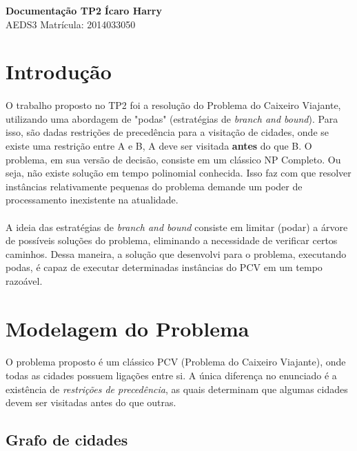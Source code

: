 \documentclass[a4paper, 12pt]{article}
\begin{document}
\noindent
\large\textbf{Documentação TP2} \hfill \textbf{Ícaro Harry} \\
\normalsize AEDS3 \hfill  Matrícula: 2014033050\\


\section{Introdução}
\paragraph{}
O trabalho proposto no TP2 foi a resolução do Problema do Caixeiro Viajante, utilizando uma abordagem de "podas" (estratégias de \textit{branch and bound}). Para isso, são dadas restrições de precedência para a visitação de cidades, onde se existe uma restrição entre A e B, A deve ser visitada \textbf{antes} do que B. O problema, em sua versão de decisão, consiste em um clássico NP Completo. Ou seja, não existe solução em tempo polinomial  conhecida. Isso faz com que resolver instâncias relativamente pequenas do problema demande um poder de processamento inexistente na atualidade. 
\paragraph{}
A ideia das estratégias de \textit{branch and bound} consiste em limitar (podar) a árvore de possíveis soluções do problema, eliminando a necessidade de verificar certos caminhos. Dessa maneira, a solução que desenvolvi para o problema, executando podas, é capaz de executar determinadas instâncias do PCV em um tempo razoável.

\section{Modelagem do Problema}
\paragraph{}
O problema proposto é um clássico PCV (Problema do Caixeiro Viajante), onde todas as cidades possuem ligações entre si. A única diferença no enunciado é a existência de \textit{restrições de precedência}, as quais determinam que algumas cidades devem ser visitadas antes do que outras.

\subsection{Grafo de cidades}
\end{document}
